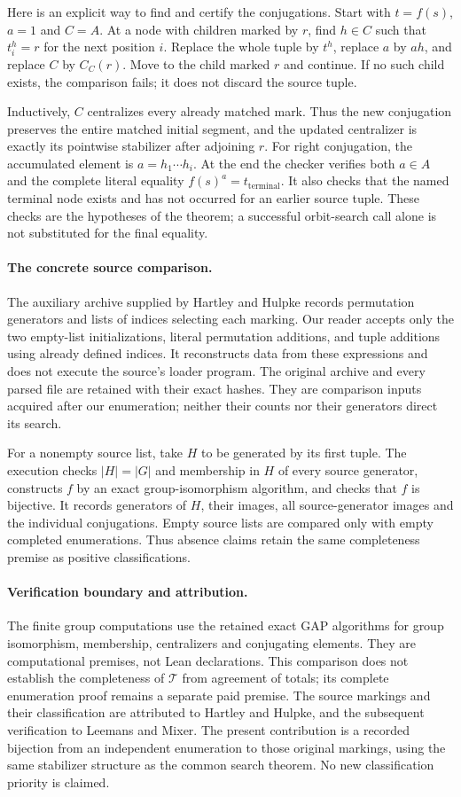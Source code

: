 \documentclass[11pt,a4paper]{article}
\begin{document}
Here is an explicit way to find and certify the conjugations. Start with
$t=f(s)$, $a=1$ and $C=A$. At a node with children marked by $r$, find
$h\in C$ such that $t_i^h=r$ for the next position $i$. Replace the
whole tuple by $t^h$, replace $a$ by $ah$, and replace $C$ by
$C_C(r)$. Move to the child marked $r$ and continue. If no such child
exists, the comparison fails; it does not discard the source tuple.

Inductively, $C$ centralizes every already matched mark. Thus the new
conjugation preserves the entire matched initial segment, and the updated
centralizer is exactly its pointwise stabilizer after adjoining $r$.
For right conjugation, the accumulated element is $a=h_1\cdots h_i$.
At the end the checker verifies both $a\in A$ and the complete literal
equality $f(s)^a=t_{\mathrm{terminal}}$. It also checks that the named
terminal node exists and has not occurred for an earlier source tuple.
These checks are the hypotheses of the theorem; a successful orbit-search
call alone is not substituted for the final equality.

\paragraph{The concrete source comparison.}
The auxiliary archive supplied by Hartley and Hulpke records permutation
generators and lists of indices selecting each marking. Our reader accepts
only the two empty-list initializations, literal permutation additions,
and tuple additions using already defined indices. It reconstructs data
from these expressions and does not execute the source's loader program.
The original archive and every parsed file are retained with their exact
hashes. They are comparison inputs acquired after our enumeration; neither
their counts nor their generators direct its search.

For a nonempty source list, take $H$ to be generated by its first tuple.
The execution checks $|H|=|G|$ and membership in $H$ of every source
generator, constructs $f$ by an exact group-isomorphism algorithm, and
checks that $f$ is bijective. It records generators of $H$, their images,
all source-generator images and the individual conjugations. Empty source
lists are compared only with empty completed enumerations. Thus absence
claims retain the same completeness premise as positive classifications.

\paragraph{Verification boundary and attribution.}
The finite group computations use the retained exact GAP algorithms for
group isomorphism, membership, centralizers and conjugating elements.
They are computational premises, not Lean declarations. This comparison
does not establish the completeness of $\mathcal T$ from agreement of
totals; its complete enumeration proof remains a separate paid premise.
The source markings and their classification are attributed to Hartley
and Hulpke, and the subsequent verification to Leemans and Mixer.
The present contribution is a recorded bijection from an independent
enumeration to those original markings, using the same stabilizer structure
as the common search theorem. No new classification priority is claimed.
\end{document}
